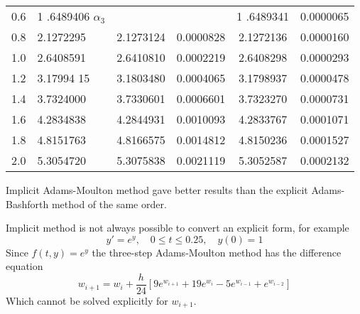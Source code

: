 \documentclass[../main-sheet.tex]{subfiles}
\begin{document}
\begin{ex}
\begin{table}[H]
\begin{tabular}{clcccc}
        0.6  & 1 .6489406 \(\alpha_3\) &                  &             & 1 .6489341                                                    & 0.0000065 \\
        0.8  & 2.1272295  & 2.1273124        & 0.0000828   & 2.1272136                                                     & 0.0000160 \\
        1.0  & 2.6408591  & 2.6410810        & 0.0002219   & 2.6408298                                                     & 0.0000293 \\
        1.2 & 3.17994 15 & 3.1803480        & 0.0004065   & 3.1798937                                                     & 0.0000478 \\
        1.4  & 3.7324000  & 3.7330601        & 0.0006601   & 3.7323270                                                     & 0.0000731 \\
        1.6  & 4.2834838  & 4.2844931        & 0.0010093   & 4.2833767                                                     & 0.0001071 \\
        1.8  & 4.8151763  & 4.8166575        & 0.0014812   & 4.8150236                                                     & 0.0001527 \\
        2.0  & 5.3054720  & 5.3075838        & 0.0021119 & 5.3052587                                                     & 0.0002132 \\ \bottomrule
        \end{tabular}
        \end{table}
    Implicit Adams-Moulton method gave better results than the explicit Adams-Bashforth method of the same order.
\end{ex}
\begin{note}
    Implicit method is not always possible to convert an explicit form, for example \[y'=e^y,\quad 0\leq t\leq 0.25,\quad y(0)=1\]
    Since \(f(t,y)=e^y\) the three-step Adams-Moulton method has the difference equation
    \[
        w_{i+1}=w_i+\frac{h}{24}\left[ 9e^{w_{i+1}}+19e^{w_{i}}-5e^{w_{i-1}}+e^{w_{i-2}} \right]
        \]
        Which cannot be solved explicitly for \(w_{i+1}\).
\end{note}
\end{document}
